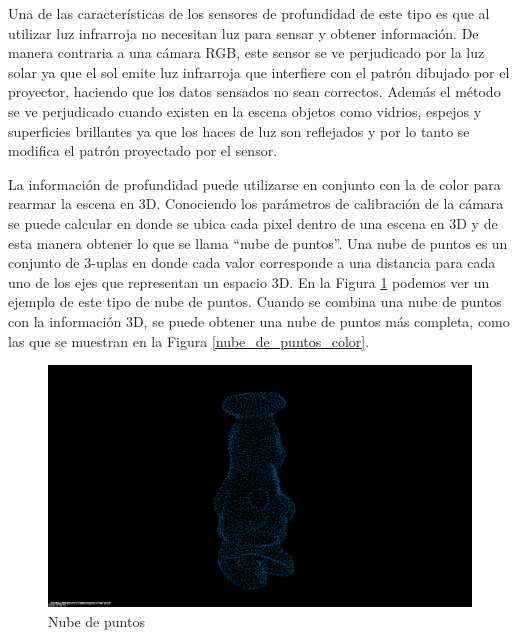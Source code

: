 Una de las características de los sensores de profundidad de este tipo es que al utilizar luz infrarroja no necesitan luz para sensar y obtener información. De manera contraria a una cámara RGB, este sensor se ve perjudicado por la luz solar ya que el sol emite luz infrarroja que interfiere con el patrón dibujado por el proyector, haciendo que los datos sensados no sean correctos. Además el método se ve perjudicado cuando existen en la escena objetos como vidrios, espejos y superficies brillantes ya que los haces de luz son reflejados y por lo tanto se modifica el patrón proyectado por el sensor.

La información de profundidad puede utilizarse en conjunto con la de color para rearmar la escena en 3D. Conociendo los parámetros de calibración de la cámara se puede calcular en donde se ubica cada pixel dentro de una escena en 3D y de esta manera obtener lo que se llama ``nube de puntos''. Una nube de puntos es un conjunto de 3-uplas en donde cada valor corresponde a una distancia para cada uno de los ejes que representan un espacio 3D. En la Figura \ref{nube_de_puntos_sola} podemos ver un ejemplo de este tipo de nube de puntos. Cuando se combina una nube de puntos con la información 3D, se puede obtener una nube de puntos más completa, como las que se muestran en la Figura \ref{nube_de_puntos_color}.

\begin{figure}
	\centering
	\includegraphics[width=\textwidth]{img/nube_de_puntos_sola.png}
	\caption{Nube de puntos}
    \label{nube_de_puntos_sola}
\end{figure}


